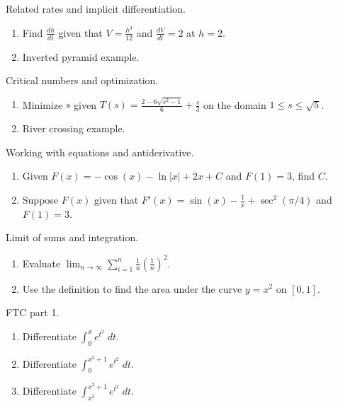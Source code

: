\documentclass[../main.tex]{subfiles}
\begin{document}
Related rates and implicit differentiation.
\begin{enumerate}
  \item Find \(\frac{dh}{dt}\) given that \(V = \frac{h^{3}}{12}\) and \(\frac{dV}{dt} = 2\) at \(h = 2\).

  \item Inverted pyramid example.
\end{enumerate}

Critical numbers and optimization.
\begin{enumerate}
  \item Minimize \(s\) given \(T(s) = \frac{2 - 6\sqrt{s^{2} - 1}}{6} + \frac{s}{3}\) on the domain \(1 \le s \le \sqrt{5}\).
  \item River crossing example.
\end{enumerate}

Working with equations and antiderivative.
\begin{enumerate}
  \item Given \(F(x) = - \cos(x) - \ln|x| + 2x + C\) and \(F(1) = 3\), find \(C\).

  \item Suppose \(F(x)\) given that \(F'(x) = \sin(x) - \frac{1}{x} + \sec^{2}(\pi/4)\) and \(F(1) = 3\).
\end{enumerate}

Limit of sums and integration.
\begin{enumerate}
  \item Evaluate \(\lim_{n \to \infty} \sum_{i=1}^{n} \frac{1}{n} \left( \frac{1}{n} \right)^{2}\).
  \item Use the definition to find the area under the curve \(y = x^{2}\) on \([0,1]\).
\end{enumerate}

FTC part 1.
\begin{enumerate}
  \item Differentiate \(\int_{0}^{x} e^{t^{2}} \;dt\).
  \item Differentiate \(\int_{0}^{x^{2}+1} e^{t^{2}} \;dt\).
  \item Differentiate \(\int_{x^{3}}^{x^{2}+1} e^{t^{2}} \;dt\).
\end{enumerate}
\end{document}
